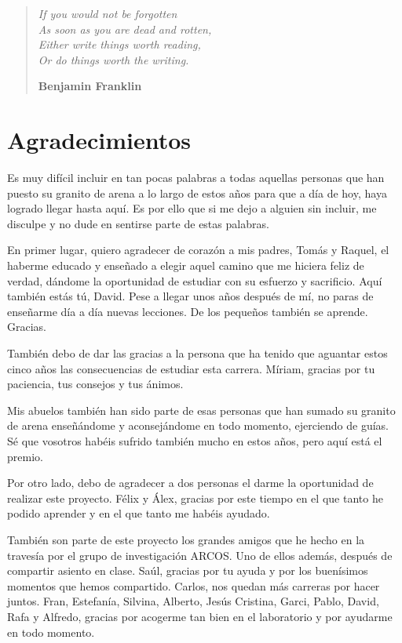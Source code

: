 \thispagestyle{empty}
\vspace*{\fill} 
\begin{quote}
\epigraph{\large \textit{If you would not be forgotten\\
As soon as you are dead and rotten, \\
Either write things worth reading, \\
Or do things worth the writing.}}{\large \flushright \textbf{Benjamin Franklin}}
\end{quote}
\vspace*{\fill} 

\afterpage{\blankpage} %

\chapter*{Agradecimientos}
%
Es muy difícil incluir en tan pocas palabras a todas aquellas personas que han puesto su granito de arena a lo largo de estos años para que a día de hoy, haya logrado llegar hasta aquí. Es por ello que si me dejo a alguien sin incluir, me disculpe y no dude en sentirse parte de estas palabras.

En primer lugar, quiero agradecer de corazón a mis padres, Tomás y Raquel, el haberme educado y enseñado a elegir aquel camino que me hiciera feliz de verdad, dándome la oportunidad de estudiar con su esfuerzo y sacrificio. Aquí también estás tú, David. Pese a llegar unos años después de mí, no paras de enseñarme día a día nuevas lecciones. De los pequeños también se aprende. Gracias.

También debo de dar las gracias a la persona que ha tenido que aguantar estos cinco años las consecuencias de estudiar esta carrera. Míriam, gracias por tu paciencia, tus consejos y tus ánimos. 

Mis abuelos también han sido parte de esas personas que han sumado su granito de arena enseñándome y aconsejándome en todo momento, ejerciendo de guías. Sé que vosotros habéis sufrido también mucho en estos años, pero aquí está el premio.

Por otro lado, debo de agradecer a dos personas el darme la oportunidad de realizar este proyecto. Félix y Álex, gracias por este tiempo en el que tanto he podido aprender y en el que tanto me habéis ayudado.

También son parte de este proyecto los grandes amigos que he hecho en la travesía por el grupo de investigación ARCOS. Uno de ellos además, después de compartir asiento en clase. Saúl, gracias por tu ayuda y por los buenísimos momentos que hemos compartido. Carlos, nos quedan más carreras por hacer juntos. Fran, Estefanía, Silvina, Alberto, Jesús Cristina, Garci, Pablo, David, Rafa y Alfredo, gracias por acogerme tan bien en el laboratorio y por ayudarme en todo momento.

